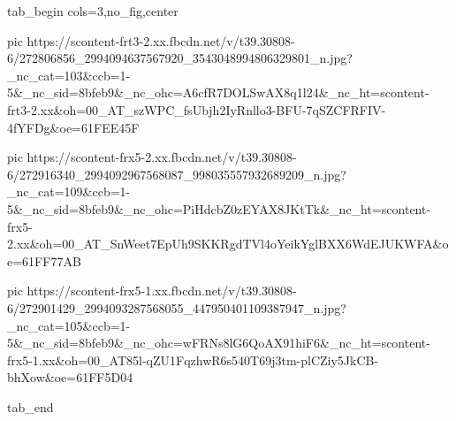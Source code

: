  
 
 
 
 


\ifcmt
  tab_begin cols=3,no_fig,center

     pic https://scontent-frt3-2.xx.fbcdn.net/v/t39.30808-6/272806856_2994094637567920_3543048994806329801_n.jpg?_nc_cat=103&ccb=1-5&_nc_sid=8bfeb9&_nc_ohc=A6cfR7DOLSwAX8q1l24&_nc_ht=scontent-frt3-2.xx&oh=00_AT_szWPC_fsUbjh2IyRnllo3-BFU-7qSZCFRFIV-4fYFDg&oe=61FEE45F

     pic https://scontent-frx5-2.xx.fbcdn.net/v/t39.30808-6/272916340_2994092967568087_998035557932689209_n.jpg?_nc_cat=109&ccb=1-5&_nc_sid=8bfeb9&_nc_ohc=PiHdcbZ0zEYAX8JKtTk&_nc_ht=scontent-frx5-2.xx&oh=00_AT_SnWeet7EpUh9SKKRgdTVl4oYeikYglBXX6WdEJUKWFA&oe=61FF77AB

     pic https://scontent-frx5-1.xx.fbcdn.net/v/t39.30808-6/272901429_2994093287568055_447950401109387947_n.jpg?_nc_cat=105&ccb=1-5&_nc_sid=8bfeb9&_nc_ohc=wFRNs8lG6QoAX91hiF6&_nc_ht=scontent-frx5-1.xx&oh=00_AT85l-qZU1FqzhwR6s540T69j3tm-plCZiy5JkCB-bhXow&oe=61FF5D04

  tab_end
\fi
